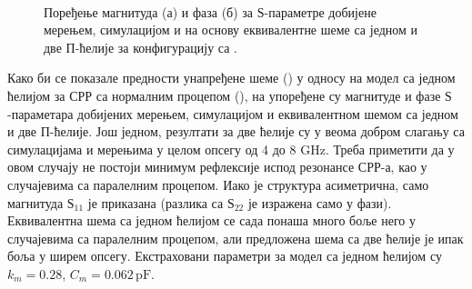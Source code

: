 \documentclass[main.tex]{subfiles}
\begin{document}
\begin{figure}[!t]
\centering
{}\\
\caption{Поређење магнитуда (а) и фаза (б) за $Ѕ$-параметре добијене мерењем, симулацијом и на основу еквивалентне шеме са једном и две П-ћелије за конфигурацију са .}
\label{f14}
\end{figure}
Како би се показале предности унапређене шеме () у односу на модел са једном ћелијом за СРР са нормалним процепом (), на  упоређене су магнитуде и фазе $Ѕ$-параметара добијених мерењем, симулацијом и еквивалентном шемом са једном и две П-ћелије. Још једном, резултати за две ћелије су у веома добром слагању са симулацијама и мерењима у целом опсегу од 4 до 8 GHz. Треба приметити да у овом случају не постоји минимум рефлексије испод резонансе СРР-а, као у случајевима са паралелним процепом. Иако је структура асиметрична, само магнитуда $Ѕ_{11}$ је приказана (разлика са $Ѕ_{22}$ је изражена само у фази). Еквивалентна шема са једном ћелијом се сада понаша много боље него у случајевима са паралелним процепом, али предложена шема са две ћелије је ипак боља у ширем опсегу. Екстраховани параметри за модел са једном ћелијом су $k_m=\num{0.28}$, $C_m=\num{0.062}\,\mathrm{pF}$.
\end{document}
